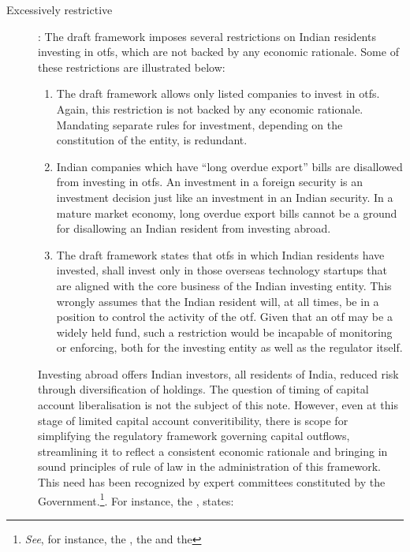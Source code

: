 \documentclass[11pt,a4paper]{article} \usepackage[parfill]{parskip}
\begin{document}
\begin{description}
\item[Excessively restrictive]: The draft framework imposes several
  restrictions on Indian residents investing in \glspl{otf}, which are
  not backed by any economic rationale. Some of these restrictions are
  illustrated below:

  \begin{enumerate}
  \item The draft framework allows only listed companies to invest in
    \glspl{otf}. Again, this restriction is not backed by any economic
    rationale. Mandating separate rules for investment, depending on
    the constitution of the entity, is redundant.
  \item Indian companies which have ``long overdue export'' bills are
    disallowed from investing in \glspl{otf}. An investment in a
    foreign security is an investment decision just like an investment
    in an Indian security. In a mature market economy, long overdue
    export bills cannot be a ground for disallowing an Indian resident
    from investing abroad.
  \item The draft framework states that \glspl{otf} in which Indian
    residents have invested, shall invest only in those overseas
    technology startups that are aligned with the core business of the
    Indian investing entity. This wrongly assumes that the Indian
    resident will, at all times, be in a position to control the
    activity of the \gls{otf}. Given that an \gls{otf} may be a widely
    held fund, such a restriction would be incapable of monitoring or
    enforcing, both for the investing entity as well as the regulator
    itself.
  \end{enumerate}

  Investing abroad offers Indian investors, all residents of India,
  reduced risk through diversification of holdings. The question of
  timing of capital account liberalisation is not the subject of this
  note. However, even at this stage of limited capital account
  converitibility, there is scope for simplifying the regulatory
  framework governing capital outflows, streamlining it to reflect a
  consistent economic rationale and bringing in sound principles of
  rule of law in the administration of this framework. This need has
  been recognized by expert committees constituted by the
  Government.\footnote{\textsl{See}, for instance, the
    , the  and the
    }. For instance, the ,
  states:


\end{description}
\end{document}
